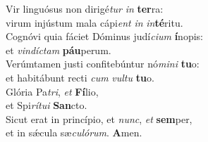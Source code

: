 \evenverse Vir linguósus non dirigé\textit{tur} \textit{in} \textbf{ter}ra:~\*\\
\evenverse virum injústum mala cápi\textit{ent} \textit{in} \textit{in}\textbf{té}ritu.\\
\oddverse Cognóvi quia fáciet Dóminus judí\textit{ci}\textit{um} \textbf{í}nopis:~\*\\
\oddverse et \textit{vin}\textit{dí}\textit{ctam} \textbf{páu}perum.\\
\evenverse Verúmtamen justi confitebúntur nó\textit{mi}\textit{ni} \textbf{tu}o:~\*\\
\evenverse et habitábunt recti \textit{cum} \textit{vul}\textit{tu} \textbf{tu}o.\\
\oddverse Glória Pa\textit{tri}, \textit{et} \textbf{Fí}lio,~\*\\
\oddverse et Spi\textit{rí}\textit{tu}\textit{i} \textbf{San}cto.\\
\evenverse Sicut erat in princípio, et \textit{nunc}, \textit{et} \textbf{sem}per,~\*\\
\evenverse et in sǽcula sæ\textit{cu}\textit{ló}\textit{rum}. \textbf{A}men.\\
